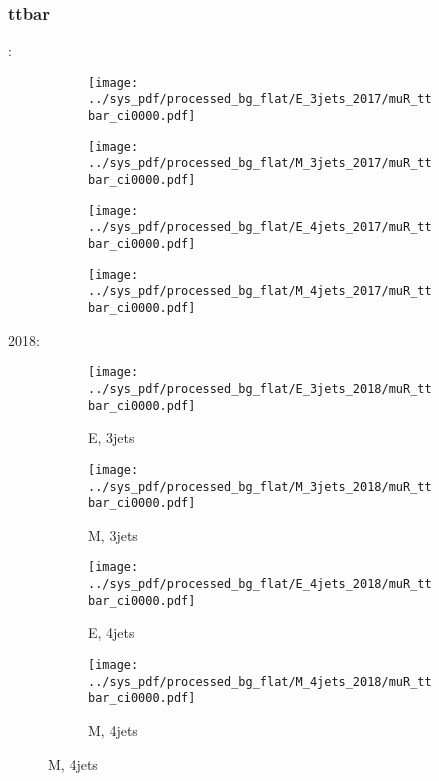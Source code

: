 \documentclass{beamer}
\begin{document}
\begin{frame}
\frametitle{ttbar}
\fontsize{5}{1}:
\begin{figure}
\centering
\begin{subfigure}[b]{0.24\textwidth}
\texttt{[image: ../sys\_pdf/processed\_bg\_flat/E\_3jets\_2017/muR\_ttbar\_ci0000.pdf]}
\end{subfigure}
\begin{subfigure}[b]{0.24\textwidth}
\texttt{[image: ../sys\_pdf/processed\_bg\_flat/M\_3jets\_2017/muR\_ttbar\_ci0000.pdf]}
\end{subfigure}
\begin{subfigure}[b]{0.24\textwidth}
\texttt{[image: ../sys\_pdf/processed\_bg\_flat/E\_4jets\_2017/muR\_ttbar\_ci0000.pdf]}
\end{subfigure}
\begin{subfigure}[b]{0.24\textwidth}
\texttt{[image: ../sys\_pdf/processed\_bg\_flat/M\_4jets\_2017/muR\_ttbar\_ci0000.pdf]}
\end{subfigure}
\end{figure}
2018:
\begin{figure}
\centering
\begin{subfigure}[b]{0.24\textwidth}
\texttt{[image: ../sys\_pdf/processed\_bg\_flat/E\_3jets\_2018/muR\_ttbar\_ci0000.pdf]}
\captionsetup{font=tiny}
\caption{E, 3jets}
\end{subfigure}
\begin{subfigure}[b]{0.24\textwidth}
\texttt{[image: ../sys\_pdf/processed\_bg\_flat/M\_3jets\_2018/muR\_ttbar\_ci0000.pdf]}
\captionsetup{font=tiny}
\caption{M, 3jets}
\end{subfigure}
\begin{subfigure}[b]{0.24\textwidth}
\texttt{[image: ../sys\_pdf/processed\_bg\_flat/E\_4jets\_2018/muR\_ttbar\_ci0000.pdf]}
\captionsetup{font=tiny}
\caption{E, 4jets}
\end{subfigure}
\begin{subfigure}[b]{0.24\textwidth}
\texttt{[image: ../sys\_pdf/processed\_bg\_flat/M\_4jets\_2018/muR\_ttbar\_ci0000.pdf]}
\captionsetup{font=tiny}
\caption{M, 4jets}
\end{subfigure}
\end{figure}
\end{frame}
\end{document}
